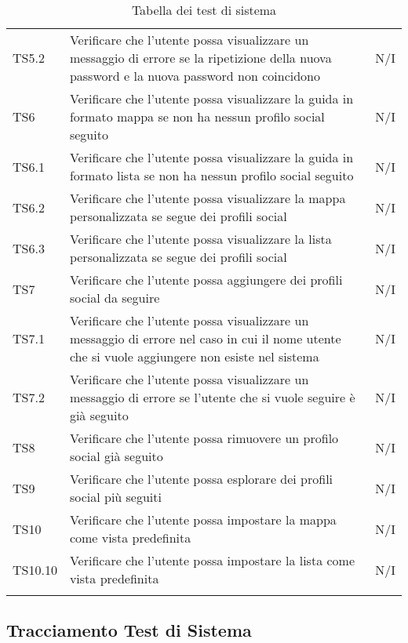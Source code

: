 {\begin{longtable}{C{.3\freewidth} C{.5\freewidth} C{.3\freewidth}}
    TS5.2 & Verificare che l'utente possa visualizzare un messaggio di errore se la ripetizione della nuova password e la nuova password non coincidono & N/I  \\
    TS6 & Verificare che l'utente possa visualizzare la guida in formato mappa se non ha nessun profilo social seguito & N/I  \\
    TS6.1 & Verificare che l'utente possa visualizzare la guida in formato lista se non ha nessun profilo social seguito & N/I  \\
    TS6.2 & Verificare che l'utente possa visualizzare la mappa personalizzata se segue dei profili social & N/I  \\
    TS6.3 & Verificare che l'utente possa visualizzare la lista personalizzata se segue dei profili social & N/I  \\
    TS7 & Verificare che l'utente possa aggiungere dei profili social da seguire & N/I  \\
    TS7.1 & Verificare che l'utente possa visualizzare un messaggio di errore nel caso in cui il nome utente che si vuole aggiungere non esiste nel sistema & N/I  \\
    TS7.2 & Verificare che l'utente possa visualizzare un messaggio di errore se l'utente che si vuole seguire è già seguito & N/I  \\
    TS8 & Verificare che l'utente possa rimuovere un profilo social già seguito & N/I  \\
    TS9 & Verificare che l'utente possa esplorare dei profili social più seguiti & N/I  \\
    TS10 & Verificare che l'utente possa impostare  la mappa come vista predefinita & N/I  \\
    TS10.10 & Verificare che l'utente possa impostare  la lista come vista predefinita & N/I  \\
    \bottomrule
    \caption{Tabella dei test di sistema}
\end{longtable}
    
}
\subsection{Tracciamento Test di Sistema}

